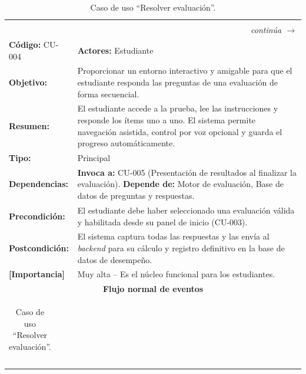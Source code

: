 \begingroup
\setlength{\LTpre}{6pt}\setlength{\LTpost}{6pt}
\renewcommand{\arraystretch}{1.20}
\footnotesize
\begin{longtable}{|p{4cm}|p{11.2cm}|}
\caption{Caso de uso ``Resolver evaluación''.}\label{tab:cu004}\\
\hline
\rowcolor{headblue}\multicolumn{2}{|c|}{\textbf{Caso de uso ``Resolver evaluación''}} \\\hline
\endfirsthead
\hline\rowcolor{headblue}\multicolumn{2}{|c|}{\textbf{Caso de uso ``Resolver evaluación'' (continuación)}} \\\hline
\endhead
\hline\multicolumn{2}{r}{\footnotesize\itshape continúa $\rightarrow$}\\
\endfoot
\hline
\endlastfoot
\textbf{Código:} CU-004 & \textbf{Actores:} Estudiante \\\hline
\textbf{Objetivo:}        & Proporcionar un entorno interactivo y amigable para que el estudiante responda las preguntas de una evaluación de forma secuencial. \\\hline
\textbf{Resumen:}         & El estudiante accede a la prueba, lee las instrucciones y responde los ítems uno a uno. El sistema permite navegación asistida, control por voz opcional y guarda el progreso automáticamente. \\\hline
\textbf{Tipo:}            & Principal \\\hline
\textbf{Dependencias:}    & \textbf{Invoca a:} CU-005 (Presentación de resultados al finalizar la evaluación). \textbf{Depende de:} Motor de evaluación, Base de datos de preguntas y respuestas. \\\hline
\textbf{Precondición:}    & El estudiante debe haber seleccionado una evaluación válida y habilitada desde su panel de inicio (CU-003). \\\hline
\textbf{Postcondición:}   & El sistema captura todas las respuestas y las envía al \textit{backend} para su cálculo y registro definitivo en la base de datos de desempeño. \\\hline
\textbf{[Importancia]}    & Muy alta -- Es el núcleo funcional para los estudiantes. \\\hline
\multicolumn{2}{|c|}{\cellcolor{grpgray}\textbf{Flujo normal de eventos}} \\\hline
\multicolumn{2}{|p{15.2cm}|}{%
  \begin{tabular}{|p{7.4cm}|p{7.4cm}|}
    \hline

\end{tabular}}
\end{longtable}
